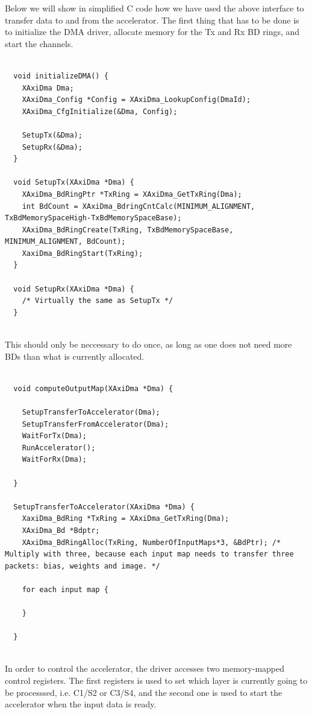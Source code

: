 Below we will show in simplified C code how we have used the above interface to transfer data to and from the accelerator. The first thing that has to be done is to initialize the DMA driver, allocate memory for the Tx and Rx BD rings, and start the channels.

\begin{lstlisting}

  void initializeDMA() {
    XAxiDma Dma;
    XAxiDma_Config *Config = XAxiDma_LookupConfig(DmaId);
    XAxiDma_CfgInitialize(&Dma, Config);

    SetupTx(&Dma);
    SetupRx(&Dma);
  }

  void SetupTx(XAxiDma *Dma) {
    XAxiDma_BdRingPtr *TxRing = XAxiDma_GetTxRing(Dma);
    int BdCount = XAxiDma_BdringCntCalc(MINIMUM_ALIGNMENT, TxBdMemorySpaceHigh-TxBdMemorySpaceBase);
    XAxiDma_BdRingCreate(TxRing, TxBdMemorySpaceBase, MINIMUM_ALIGNMENT, BdCount);
    XaxiDma_BdRingStart(TxRing);
  }

  void SetupRx(XAxiDma *Dma) {
    /* Virtually the same as SetupTx */
  }
  
\end{lstlisting}

This should only be neccessary to do once, as long as one does not need more BDs than what is currently allocated.

\begin{lstlisting}

  void computeOutputMap(XAxiDma *Dma) {

    SetupTransferToAccelerator(Dma);
    SetupTransferFromAccelerator(Dma);
    WaitForTx(Dma);
    RunAccelerator();
    WaitForRx(Dma);
    
  }

  SetupTransferToAccelerator(XAxiDma *Dma) {
    XaxiDma_BdRing *TxRing = XAxiDma_GetTxRing(Dma);
    XAxiDma_Bd *Bdptr;
    XAxiDma_BdRingAlloc(TxRing, NumberOfInputMaps*3, &BdPtr); /* Multiply with three, because each input map needs to transfer three packets: bias, weights and image. */

    for each input map {
      
    }
    
  }
  
\end{lstlisting}





In order to control the accelerator, the driver accesses two memory-mapped control registers. The first registers is used to set which layer is currently going to be processsed, i.e. C1/S2 or C3/S4, and the second one is used to start the accelerator when the input data is ready. 


